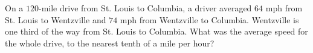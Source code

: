 On a $120$-mile drive from St. Louis to Columbia, a driver averaged $64$ mph from St. Louis to Wentzville and $74$ mph from Wentzville to Columbia. Wentzville is one third of the way from St. Louis to Columbia. What was the average speed for the whole drive, to the nearest tenth of a mile per hour?
